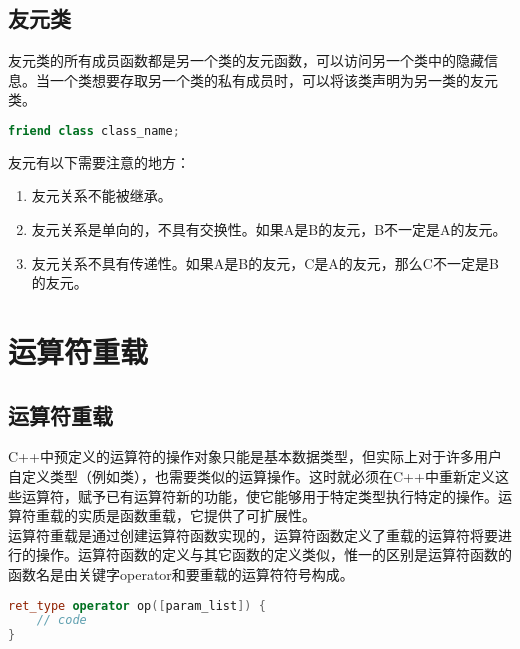 \subsection{友元类}

友元类的所有成员函数都是另一个类的友元函数，可以访问另一个类中的隐藏信息。当一个类想要存取另一个类的私有成员时，可以将该类声明为另一类的友元类。

\vspace{-0.5cm}

\begin{lstlisting}[language=C++]
friend class class_name;
\end{lstlisting}

友元有以下需要注意的地方：

\begin{enumerate}
	\item 友元关系不能被继承。
	\item 友元关系是单向的，不具有交换性。如果A是B的友元，B不一定是A的友元。
	\item 友元关系不具有传递性。如果A是B的友元，C是A的友元，那么C不一定是B的友元。
\end{enumerate}

\newpage

\section{运算符重载}

\subsection{运算符重载}

C++中预定义的运算符的操作对象只能是基本数据类型，但实际上对于许多用户自定义类型（例如类），也需要类似的运算操作。这时就必须在C++中重新定义这些运算符，赋予已有运算符新的功能，使它能够用于特定类型执行特定的操作。运算符重载的实质是函数重载，它提供了可扩展性。 \\

运算符重载是通过创建运算符函数实现的，运算符函数定义了重载的运算符将要进行的操作。运算符函数的定义与其它函数的定义类似，惟一的区别是运算符函数的函数名是由关键字operator和要重载的运算符符号构成。

\vspace{-0.5cm}

\begin{lstlisting}[language=C++]
ret_type operator op([param_list]) {
    // code
}
\end{lstlisting}


